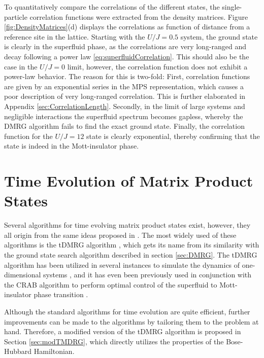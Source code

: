 To quantitatively compare the correlations of the different states, the single-particle correlation functions were extracted from the density matrices. Figure \ref{fig:DensityMatrices}(d) displays the correlations as function of distance from a reference site in the lattice.
Starting with the $U/J = 0.5$ system, the ground state is clearly in the superfluid phase, as the correlations are very long-ranged and decay following a power law \eqref{eq:superfluidCorrelation}. This should also be the case in the $U/J = 0$ limit, however, the correlation function does not exhibit a power-law behavior. The reason for this is two-fold: First, correlation functions are given by an exponential series in the MPS representation, which causes a poor description of very long-ranged correlation. This is further elaborated in Appendix \ref{sec:CorrelationLength}. Secondly, in the limit of large systems and negligible interactions the superfluid spectrum becomes gapless, whereby the DMRG algorithm fails to find the exact ground state. Finally, the correlation function for the $U/J = 12$ state is clearly exponential, thereby confirming that the state is indeed in the Mott-insulator phase.



\section{Time Evolution of Matrix Product States}
Several algorithms for time evolving matrix product states exist, however, they all origin from the same ideas proposed in \cite{Vidal2003,Vidal2004}. The most widely used of these algorithms is the tDMRG algorithm \cite{Daley2004}, which gets its name from its similarity with the ground state search algorithm described in section \ref{sec:DMRG}. The tDMRG algorithm has been utilized in several instances to simulate the dynamics of one-dimensional systems \cite{Verstraete2004,Vznidarivc2008,Cazalilla2002}, and it has even been previously used in conjunction with the CRAB algorithm to perform optimal control of the superfluid to Mott-insulator phase transition \cite{FrankBloch,Doria2011}.

Although the standard algorithms for time evolution are quite efficient, further improvements can be made to the algorithms by tailoring them to the problem at hand. Therefore, a modified version of the tDMRG algorithm is proposed in Section \ref{sec:modTMDRG}, which directly utilizes the properties of the Bose-Hubbard Hamiltonian.


